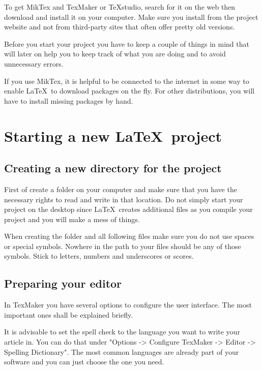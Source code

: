 \documentclass[]{tufte-book} %
\begin{document}
To get MikTex and TexMaker or TeXstudio, search for it on the web then download and install it on your computer. Make sure you install from the project website and not from third-party sites that often offer pretty old versions. 
  
Before you start your project you have to keep a couple of things in mind that will later on help you to keep track of what you are doing and to avoid unnecessary errors.
 
If you use MikTex, it is helpful to be connected to the internet in some way to enable \LaTeX\ to download packages on the fly. For other distributions, you will have to install missing packages by hand. 


\chapter{Starting a new \LaTeX\ project}


\section{Creating a new directory for the project}

First of create a folder on your computer and make sure that you have the necessary rights to read and write in that location. Do not simply start your project on the desktop since \LaTeX\ creates additional files as you compile your project and you will make a mess of things.
 
When creating the folder and all following files make sure you do not use spaces or special symbols. Nowhere in the path to your files should be any of those symbols. Stick to letters, numbers and underscores or scores. 


\section{Preparing your editor}

In TexMaker you have several options to configure the user interface. The most important ones shall be explained briefly. 

It is advisable to set the spell check to the language you want to write your article in. You can do that under "Options -> Configure TexMaker -> Editor -> Spelling Dictionary". The most common languages are already part of your software and you can just choose the one you need.  
\end{document}
